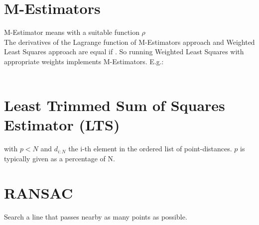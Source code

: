 \documentclass[a4paper,12pt,pdftex]{scrreprt}
\begin{document}
	\section{M-Estimators} %
	\label{sec:m_estimators}
	M-Estimator means 
	 with a suitable function $\rho$\\
	The derivatives of the Lagrange function of M-Estimators approach and Weighted Least Squares approach are equal if . So running Weighted Least Squares with appropriate weights implements M-Estimators. E.g.:\\
	\\

	\section{Least Trimmed Sum of Squares Estimator (LTS)} %
	\label{sec:least_trimmed_sum_of_squares_estimator_}
	 with $p<N$ and $d_{i:N}$ the i-th element in the ordered list of point-distances. $p$ is typically given as a percentage of N.

	\section{RANSAC} %
	\label{sec:ransac}
	Search a line that passes nearby as many points as possible.\\
\end{document}
